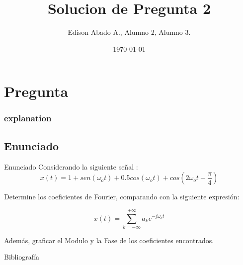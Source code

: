 \documentclass[aspectratio=169, 8pt]{beamer}
\title[Señales y Sistemas]{Solucion de Pregunta 2} %
\author{Edison Abado A., Alumno 2, Alumno 3.} %
\institute[UNSAAC] %
{
	\begin{figure}[hbtp]
		\centering
		\texttt{[image: IMAGENES/escudo b]}
	\end{figure}

}
\date{\today} %
\begin{document}
\begin{frame}
\titlepage %
\end{frame}




\section{Pregunta}
\frametitle{explanation}
\begin{frame}
\subsection{Enunciado}

\begin{exampleblock}{Enunciado}
	Considerando la siguiente señal \cite{Oppenheim}:
	\begin{equation}
		x(t) = 1 + sen(\omega_o t) + 0.5cos (\omega_o t) + cos\left(2 \omega_o t + \frac{\pi}{4}\right)
		\label{ec1}
	\end{equation}
	
	Determine los coeficientes de Fourier, comparando con la siguiente expresión:
	
	\begin{equation}
		x(t)=\sum_{k=-\infty}^{+ \infty} a_k e^{-j\omega_ot}
	\end{equation}
	
	Además, graficar el Modulo y la Fase de los coeficientes encontrados.
\end{exampleblock}
\end{frame}



\begin{frame}{Bibliografía}
	
	
\end{frame}
\end{document}
